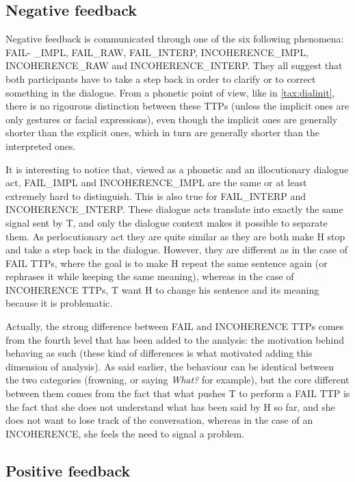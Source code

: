     \subsection{Negative feedback}

         Negative feedback is communicated through one of the six following phenomena: FAIL- \_IMPL, FAIL\_RAW, FAIL\_INTERP, INCOHERENCE\_IMPL, INCOHERENCE\_RAW and INCOHERENCE\_INTERP. They all suggest that both participants have to take a step back in order to clarify or to correct something in the dialogue. From a phonetic point of view, like in \ref{tax:dialinit}, there is no rigourous distinction between these TTPs (unless the implicit ones are only gestures or facial expressions), even though the implicit ones are generally shorter than the explicit ones, which in turn are generally shorter than the interpreted ones.

         It is interesting to notice that, viewed as a phonetic and an illocutionary dialogue act, FAIL\_IMPL and INCOHERENCE\_IMPL are the same or at least extremely hard to distinguish. This is also true for FAIL\_INTERP and INCOHERENCE\_INTERP. These dialogue acts translate into exactly the same signal sent by T, and only the dialogue context makes it possible to separate them. As perlocutionary act they are quite similar as they are both make H stop and take a step back in the dialogue. However, they are different as in the case of FAIL TTPs, where the goal is to make H repeat the same sentence again (or rephrases it while keeping the same meaning), whereas in the case of INCOHERENCE TTPs, T want H to change his sentence and its meaning because it is problematic.

         Actually, the strong difference between FAIL and INCOHERENCE TTPs comes from the fourth level that has been added to the analysis: the motivation behind behaving as such (these kind of differences is what motivated adding this dimension of analysis). As said earlier, the behaviour can be identical between the two categories (frowning, or saying \textit{What?} for example), but the core different between them comes from the fact that what pushes T to perform a FAIL TTP is the fact that she does not understand what has been said by H so far, and she does not want to lose track of the conversation, whereas in the case of an INCOHERENCE, she feels the need to signal a problem.

    \subsection{Positive feedback}
		
